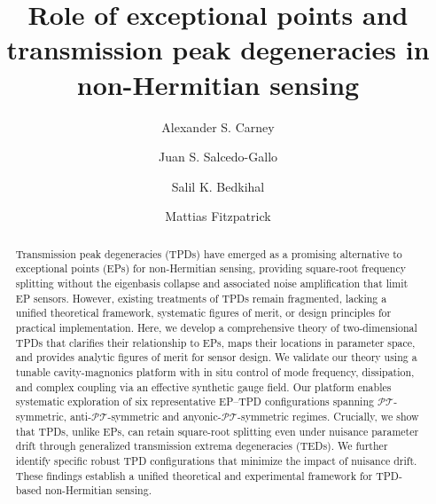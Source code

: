 \documentclass[%
  reprint,
  amsmath,amssymb,
  aps,
  prapplied,
  superscriptaddress,
  longbibliography]{revtex4-2}
\begin{document}

\title{Role of exceptional points and transmission peak degeneracies in non-Hermitian sensing}

\author{Alexander S. Carney}

\author{Juan S. Salcedo-Gallo}

\author{Salil K. Bedkihal}

\author{Mattias Fitzpatrick}


\begin{abstract}
Transmission peak degeneracies (TPDs) have emerged as a promising alternative to exceptional points (EPs) for non-Hermitian sensing, providing square-root frequency splitting without the eigenbasis collapse and associated noise amplification that limit EP sensors. However, existing treatments of TPDs remain fragmented, lacking a unified theoretical framework, systematic figures of merit, or design principles for practical implementation. Here, we develop a comprehensive theory of two-dimensional TPDs that clarifies their relationship to EPs, maps their locations in parameter space, and provides analytic figures of merit for sensor design. We validate our theory using a tunable cavity-magnonics platform with in situ control of mode frequency, dissipation, and complex coupling via an effective synthetic gauge field. Our platform enables systematic exploration of six representative EP–TPD configurations spanning $\mathcal{PT}$-symmetric, anti-$\mathcal{PT}$-symmetric and anyonic-$\mathcal{PT}$-symmetric regimes. Crucially, we show that TPDs, unlike EPs, can retain square-root splitting even under nuisance parameter drift through generalized transmission extrema degeneracies (TEDs). We further identify specific robust TPD configurations that minimize the impact of nuisance drift. These findings establish a unified theoretical and experimental framework for TPD-based non-Hermitian sensing.
\end{abstract}
\end{document}
